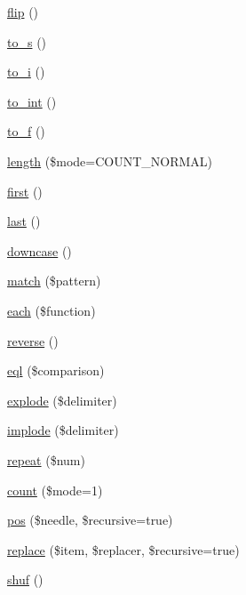 \begin{DoxyCompactItemize}
\item 
\hyperlink{class_pierce_moore_1_1_ruby_p_h_p_1_1r_ab7b978294481794664ea5ffa6530e020}{flip} ()
\item 
\hyperlink{class_pierce_moore_1_1_ruby_p_h_p_1_1r_a4968be1bfca5da3a210d46e21bd080ff}{to\-\_\-s} ()
\item 
\hyperlink{class_pierce_moore_1_1_ruby_p_h_p_1_1r_aa1ea52bbf266b7ba98c1198ca335ddf1}{to\-\_\-i} ()
\item 
\hyperlink{class_pierce_moore_1_1_ruby_p_h_p_1_1r_a2d59e8b9284086c0dd59203615f28d2e}{to\-\_\-int} ()
\item 
\hyperlink{class_pierce_moore_1_1_ruby_p_h_p_1_1r_ad12032cdf12c784eafa8994f13f464df}{to\-\_\-f} ()
\item 
\hyperlink{class_pierce_moore_1_1_ruby_p_h_p_1_1r_a93564c0bb378f8d37470946df4d09ceb}{length} (\$mode=C\-O\-U\-N\-T\-\_\-\-N\-O\-R\-M\-A\-L)
\item 
\hyperlink{class_pierce_moore_1_1_ruby_p_h_p_1_1r_ac73eef9ff76ea330c0dab36ca448b90d}{first} ()
\item 
\hyperlink{class_pierce_moore_1_1_ruby_p_h_p_1_1r_ac90cadb327363232bb2d83a4f8ebd613}{last} ()
\item 
\hyperlink{class_pierce_moore_1_1_ruby_p_h_p_1_1r_ac627a4ea49a87091d67dd7e1319bc872}{downcase} ()
\item 
\hyperlink{class_pierce_moore_1_1_ruby_p_h_p_1_1r_a59c310be108326e741acb1a678ff9bbe}{match} (\$pattern)
\item 
\hyperlink{class_pierce_moore_1_1_ruby_p_h_p_1_1r_a6c0a4c47b3531bcc641e0aa02e155f00}{each} (\$function)
\item 
\hyperlink{class_pierce_moore_1_1_ruby_p_h_p_1_1r_a601c54a2a4082e5d8dfc4509b07ea958}{reverse} ()
\item 
\hyperlink{class_pierce_moore_1_1_ruby_p_h_p_1_1r_a3a9f9703b0a2b7a455a1e109f96f706d}{eql} (\$comparison)
\item 
\hyperlink{class_pierce_moore_1_1_ruby_p_h_p_1_1r_a10e05ecaba9b6f166c05c706bcdc7d40}{explode} (\$delimiter)
\item 
\hyperlink{class_pierce_moore_1_1_ruby_p_h_p_1_1r_aaff5dc48f0111dbc1298959cd7813709}{implode} (\$delimiter)
\item 
\hyperlink{class_pierce_moore_1_1_ruby_p_h_p_1_1r_ab924f20be77fca419f8433a2c8df810a}{repeat} (\$num)
\item 
\hyperlink{class_pierce_moore_1_1_ruby_p_h_p_1_1r_af7fc0f34bd91e802322d34f8942c3eee}{count} (\$mode=1)
\item 
\hyperlink{class_pierce_moore_1_1_ruby_p_h_p_1_1r_a3792ea27c7c50f1509214cbe67bd62e4}{pos} (\$needle, \$recursive=true)
\item 
\hyperlink{class_pierce_moore_1_1_ruby_p_h_p_1_1r_a00197520cfed5500d7431e09fa4d58a6}{replace} (\$item, \$replacer, \$recursive=true)
\item 
\hyperlink{class_pierce_moore_1_1_ruby_p_h_p_1_1r_a6595f5d5f838d64df0210138f2cef0bd}{shuf} ()
\end{DoxyCompactItemize}
